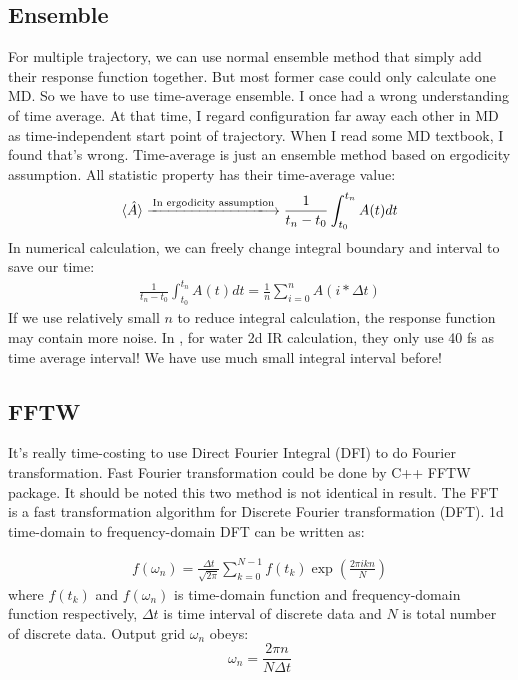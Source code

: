 \documentclass[12pt,a4paper,scale=1.0]{article}
\begin{document}
 	\subsection{Ensemble}
 	For multiple trajectory, we can use normal ensemble method that simply add their response function together. But most former case could only calculate one MD. So we have to use time-average ensemble.
 	I once had a wrong understanding of time average. At that time, I regard configuration far away each other in MD as time-independent start point of trajectory. When I read some MD textbook, I found that's wrong. Time-average is just an ensemble method based on ergodicity assumption. All statistic property has their time-average value:
	\begin{equation}\label{equ:3-1}
	\begin{aligned}
	\langle \hat A \rangle \xlongrightarrow{ \text{In ergodicity assumption} } \frac{1}{t_n-t_0} \int_{t_0}^{t_n} A(t) dt
	 	\end{aligned}
	\end{equation}
	In  numerical calculation, we can freely change integral boundary and interval to save our time:
		\begin{equation}\label{equ:3-2}
	\begin{aligned}
	 \frac{1}{t_n-t_0} \int_{t_0}^{t_n} A(t) dt = 
	 \frac{1}{n} \sum_{i=0}^{n} A(i*\Delta t)  
	\end{aligned}
	\end{equation}
	If we use relatively  small $n$ to reduce integral calculation, the response function may contain more noise. In \cite{hamm_zanni_2011} , for water 2d IR calculation, they only use 40 fs as time average interval! We have use much small integral interval before!
	
	\subsection{FFTW}
	It's really time-costing to use Direct Fourier Integral (DFI) to do Fourier transformation. Fast Fourier transformation could be done by C++ FFTW package. It should be noted this two method is not identical  in result. The FFT is a fast transformation algorithm for Discrete Fourier transformation (DFT). 1d time-domain to frequency-domain DFT can be written as:
	
 	\begin{equation}\label{equ:4-1}
 	\begin{aligned}
 	f(\omega_n) = \frac{\Delta t}{\sqrt{2\pi}} \sum_{k=0}^{N-1} f(t_k) \exp( \frac{2\pi ikn}{N})
 	\end{aligned}
 	\end{equation}
 	where $f(t_k)$ and $f(\omega_n)$ is time-domain function and frequency-domain function respectively, $\Delta t$ is time interval of discrete data and $N$ is total number of discrete data.  Output grid $\omega_n$ obeys:
 	\begin{equation}\label{equ:4-2}
 	\omega_n = \frac{2\pi n}{N\Delta t}
 	\end{equation}
 	
\end{document}

